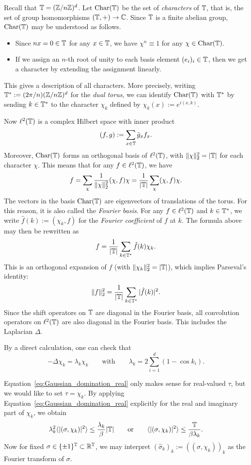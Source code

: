 \color{blue}
Recall that $\mathbb T=(\mathbb Z/n\mathbb Z)^d$.
Let \(\operatorname{Char}(\mathbb T)\) be the set of \emph{characters}
of $\mathbb T$, that is, the set of group homomorphisms $(\mathbb T,+)\to\mathbb C$.
Since $\mathbb T$ is a finite abelian group, \(\operatorname{Char}(\mathbb T)\) may be understood as follows.
\begin{itemize}
    \item Since $nx=0\in\mathbb T$ for any $x\in\mathbb T$, we have $\chi^n\equiv 1$ for any
        $\chi\in\operatorname{Char}(\mathbb T)$.
    \item If we assign an $n$-th root of unity to each basis element $(e_i)_i\in\mathbb T$, then
        we get a character by extending the assignment linearly.
\end{itemize}
This gives a description of all characters.
More precisely,
writing $\mathbb T^*:=(2\pi/n)(\mathbb Z/n\mathbb Z)^d$ for the \emph{dual torus}, we can identify
$\operatorname{Char}(\mathbb T)$ with $\mathbb T^*$ by sending $k\in\mathbb T^*$ to the character $\chi_k$
defined by $\chi_k(x):=e^{i(x,k)}$.

Now $\ell^2(\mathbb T)$ is a complex Hilbert space with inner product
\[
    (f,g):=\sum_{x\in \mathbb T} \bar g_x f_x.
\]
Moreover, $\operatorname{Char}(\mathbb T)$ forms an orthogonal basis of $\ell^2(\mathbb T)$, with
$\|\chi\|_2^2=|\mathbb T|$ for each character $\chi$.
This means that for any $f\in\ell^2(\mathbb T)$, we have
\[
    f = \sum_{\chi}\frac{1}{\|\chi\|_2^2}(\chi,f)\chi = \frac1{|\mathbb T|}\sum_{\chi}(\chi,f)\chi.
\]
The vectors in the basis $\operatorname{Char}(\mathbb T)$ are eigenvectors of translations of the torus.
For this reason, it is also called the \emph{Fourier basis}.
For any $f\in\ell^2(\mathbb T)$ and $k\in\mathbb T^*$, we write $\hat f(k):=(\chi_k,f)$ for the
\emph{Fourier coefficient} of $f$ at $k$.
The formula above may then be rewritten as
\[
    f = \frac1{|\mathbb T|}\sum_{k\in\mathbb T^*} \hat f(k) \chi_k.
\]
This is an orthogonal expansion of $f$ (with $\|\chi_k\|_2^2=|\mathbb T|$), which implies
Parseval's identity:
\[
    \|f\|_2^2 = \frac1{|\mathbb T|}\sum_{k\in\mathbb T^*} |\hat f(k)|^2.
\]
Since the shift operators on $\mathbb T$ are diagonal in the Fourier basis,
all convolution operators on $\ell^2(\mathbb T)$ are also diagonal in the Fourier basis.
This includes the Laplacian $\Delta$.
\color{black}

By a direct calculation, one can check that
\[
    -\Delta\chi_k = \lambda_k\chi_k
    \qquad\text{with}\qquad
    \lambda_k = 2\sum_{i=1}^d (1-\cos k_i).
\]

Equation~\eqref{eq:Gaussian_domination_real} only makes sense for real-valued $\tau$,
but we would like to set $\tau=\chi_k$.
By applying Equation~\eqref{eq:Gaussian_domination_real} explicitly for the
real and imaginary part of $\chi_k$, we obtain
\begin{equation}
    \label{eq:Gaussian_domination_Fourier}
    \lambda_k^2\langle|(\sigma,\chi_k)|^2\rangle \leq \frac{\lambda_k}\beta |\T|
    \qquad\text{or}\qquad
    \langle|(\sigma,\chi_k)|^2\rangle \leq \frac{\T}{\beta\lambda_k}.
\end{equation}
Now for fixed $\sigma\in\{\pm 1\}^\mathbb T\subset \mathbb R^\mathbb T$,
we may interpret $(\hat\sigma_k)_k:=((\sigma,\chi_k))_k$ as the Fourier
transform of $\sigma$.

